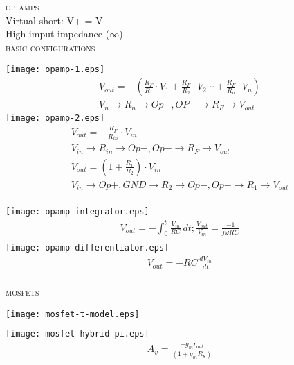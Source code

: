 \documentclass[10pt,letterpaper,english]{article}
\begin{document}
\textsc{op-amps}\\
Virtual short: V+ = V-\\
High imput impedance ($\infty$)\\
\textsc{basic configurations}
\begin{multicols}{2}
\texttt{[image: opamp-1.eps]}
\begin{align*}
V_{out} = -\left(\frac{R_F}{R_1}\cdot V_1 + \frac{R_F}{R_2}\cdot V_2 \cdots + \frac{R_F}{R_n}\cdot V_n\right)\\
V_n\rightarrow R_n\rightarrow Op-, OP- \rightarrow R_F \rightarrow V_{out}
\end{align*}
\texttt{[image: opamp-2.eps]}
\begin{align*}
V_{out} = -\frac{R_F}{R_{in}}\cdot V_{in} \tag*{(1) Inverting}\\
V_{in}\rightarrow R_{in} \rightarrow Op-, Op- \rightarrow R_F \rightarrow V_{out}\\
V_{out} = \left(1 + \frac{R_1}{R_2}\right)\cdot V_{in} \tag*{(2) Non-inverting}\\
V_{in}\rightarrow Op+, GND \rightarrow R_2 \rightarrow Op-, Op- \rightarrow R_1 \rightarrow V_{out}\\
\end{align*}
\end{multicols}


\begin{multicols}{2}
\texttt{[image: opamp-integrator.eps]}
\begin{align*}
V_{out} = -\int_0^t \frac{V_{in}}{RC} \,dt; \frac{V_{out}}{V_{in}} = \frac{-1}{j \omega RC} \tag*{Integrator / Low-pass}\\
\end{align*}
\texttt{[image: opamp-differentiator.eps]}
\begin{align*}
V_{out} = -RC \frac{\,dV_{in}}{\,dt} \tag*{Differentiator / High-pass}\\
\end{align*}
\end{multicols}


\textsc{mosfets}\\

\begin{multicols}{2}
\texttt{[image: mosfet-t-model.eps]}
\begin{align*}
\tag*{Mosfet T-model}\\
\end{align*}
\texttt{[image: mosfet-hybrid-pi.eps]}
\vspace{2mm}
\begin{align*}
A_v = \frac{-g_mr_{out}}{(1 + g_mR_S)} \tag*{Mosfet hybrid pi model}\\
\end{align*}
\end{multicols}
\end{document}
